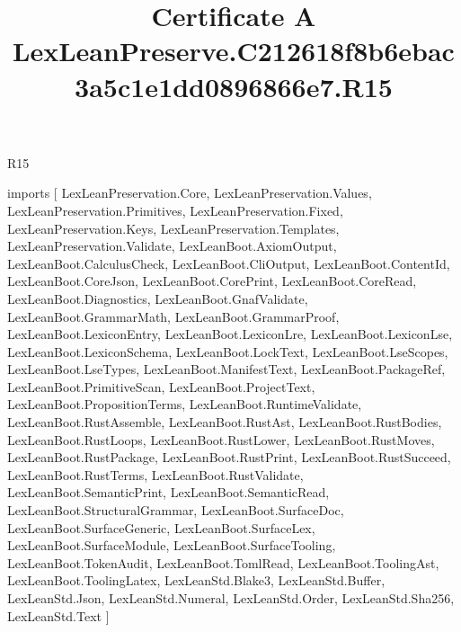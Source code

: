 \begin{lexlean}{R15}
\title{Certificate A LexLeanPreserve.C212618f8b6ebac3a5c1e1dd0896866e7.R15}
\begin{coremodule}
imports [
  LexLeanPreservation.Core,
  LexLeanPreservation.Values,
  LexLeanPreservation.Primitives,
  LexLeanPreservation.Fixed,
  LexLeanPreservation.Keys,
  LexLeanPreservation.Templates,
  LexLeanPreservation.Validate,
  LexLeanBoot.AxiomOutput,
  LexLeanBoot.CalculusCheck,
  LexLeanBoot.CliOutput,
  LexLeanBoot.ContentId,
  LexLeanBoot.CoreJson,
  LexLeanBoot.CorePrint,
  LexLeanBoot.CoreRead,
  LexLeanBoot.Diagnostics,
  LexLeanBoot.GnafValidate,
  LexLeanBoot.GrammarMath,
  LexLeanBoot.GrammarProof,
  LexLeanBoot.LexiconEntry,
  LexLeanBoot.LexiconLre,
  LexLeanBoot.LexiconLse,
  LexLeanBoot.LexiconSchema,
  LexLeanBoot.LockText,
  LexLeanBoot.LseScopes,
  LexLeanBoot.LseTypes,
  LexLeanBoot.ManifestText,
  LexLeanBoot.PackageRef,
  LexLeanBoot.PrimitiveScan,
  LexLeanBoot.ProjectText,
  LexLeanBoot.PropositionTerms,
  LexLeanBoot.RuntimeValidate,
  LexLeanBoot.RustAssemble,
  LexLeanBoot.RustAst,
  LexLeanBoot.RustBodies,
  LexLeanBoot.RustLoops,
  LexLeanBoot.RustLower,
  LexLeanBoot.RustMoves,
  LexLeanBoot.RustPackage,
  LexLeanBoot.RustPrint,
  LexLeanBoot.RustSucceed,
  LexLeanBoot.RustTerms,
  LexLeanBoot.RustValidate,
  LexLeanBoot.SemanticPrint,
  LexLeanBoot.SemanticRead,
  LexLeanBoot.StructuralGrammar,
  LexLeanBoot.SurfaceDoc,
  LexLeanBoot.SurfaceGeneric,
  LexLeanBoot.SurfaceLex,
  LexLeanBoot.SurfaceModule,
  LexLeanBoot.SurfaceTooling,
  LexLeanBoot.TokenAudit,
  LexLeanBoot.TomlRead,
  LexLeanBoot.ToolingAst,
  LexLeanBoot.ToolingLatex,
  LexLeanStd.Blake3,
  LexLeanStd.Buffer,
  LexLeanStd.Json,
  LexLeanStd.Numeral,
  LexLeanStd.Order,
  LexLeanStd.Sha256,
  LexLeanStd.Text
]


\end{coremodule}
\end{lexlean}
